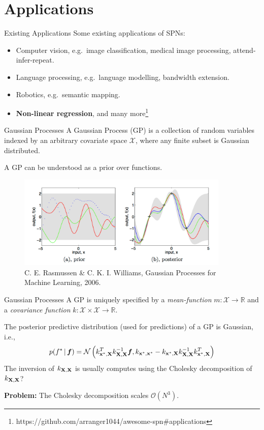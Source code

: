 \section{Applications}

\begin{frame}{Existing Applications}
Some existing applications of SPNs:
\begin{itemize}
    \item Computer vision, e.g.~image classification, medical image processing, attend-infer-repeat.
    \item Language processing, e.g.~language modelling, bandwidth extension.
    \item Robotics, e.g.~semantic mapping.
    \item \textbf{Non-linear regression}, and many more\footnote{\scriptsize https://github.com/arranger1044/awesome-spn\#applications}
\end{itemize}
\end{frame}

\begin{frame}{Gaussian Processes}
    A Gaussian Process (GP) is a collection of random variables indexed by an arbitrary
    covariate space $\mathcal{X}$, where any finite subset is Gaussian distributed.

    A GP can be understood as a prior over functions.

    \begin{figure}
        \includegraphics[width=0.9\textwidth]{GP_Rasmussen}
        \caption{\scriptsize C. E. Rasmussen \& C. K. I. Williams, Gaussian Processes for Machine Learning, 2006.}
    \end{figure}
\end{frame}

\begin{frame}{Gaussian Processes}
A GP is uniquely specified by a \emph{mean-function} $m: \mathcal{X} \rightarrow \mathbb{R}$ and a \emph{covariance function} $k: \mathcal{X} \times \mathcal{X} \rightarrow \mathbb{R}$.

The posterior predictive distribution (used for predictions) of a GP is Gaussian, i.e.,
\begin{equation}
    p(f^* \,|\, \bm f) = \mathcal{N}\left( k^T_{\mathbf{x}^{*},\mathbf{X}} k^{-1}_{\mathbf{X},\mathbf{X}} \bm f , k_{\mathbf{x}^{*},\mathbf{x}^{*}} - k_{\mathbf{x}^{*},\mathbf{X}} k^{-1}_{\mathbf{X},\mathbf{X}}k^T_{\mathbf{x}^{*},\mathbf{X}}   \right)
\end{equation}
The inversion of $k_{\mathbf{X},\mathbf{X}}$ is usually computes using the Cholesky decomposition of $k_{\mathbf{X},\mathbf{X}}$?

\pause
\textbf{Problem:} The Cholesky decomposition scales $\mathcal{O}(N^3)$.
\end{frame}


